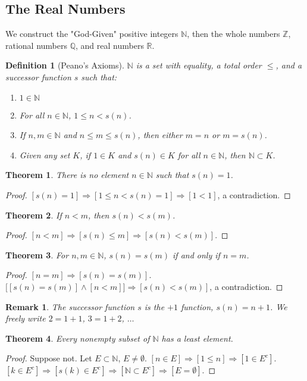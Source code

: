 \documentclass[crop=false,class=book]{standalone}
\theoremstyle{mystyle}
\newtheorem{theorem}{Theorem}[section]
\newtheorem{definition}{Definition}[section]
\newtheorem{remark}{Remark}[section]
\begin{document}
\subsection{The Real Numbers}
We construct the "God-Given" positive integers $\mathbb{N}$, then the whole numbers $\mathbb{Z}$, rational numbers $\mathbb{Q}$, and real numbers $\mathbb{R}$.
\begin{definition}[Peano's Axioms]
$\mathbb{N}$ is a set with equality, a total order $\leq$, and a successor function $s$ such that:
\begin{enumerate}
\item $1\in \mathbb{N}$
\item For all $n\in \mathbb{N}$, $1\leq n < s(n)$.
\item If $n,m\in \mathbb{N}$ and $n\leq m \leq s(n)$, then either $m=n$ or $m=s(n)$.
\item Given any set $K$, if $1\in K$ and $s(n)\in K$ for all $n\in \mathbb{N}$, then $\mathbb{N}\subset K$.
\end{enumerate}
\end{definition}
\begin{theorem}
There is no element $n\in \mathbb{N}$ such that $s(n) =1$.
\end{theorem}
\begin{proof}
$[s(n) = 1]\Rightarrow [1\leq n < s(n)=1]\Rightarrow[1<1]$, a contradiction.
\end{proof}
\begin{theorem}
If $n<m$, then $s(n)< s(m)$.
\end{theorem}
\begin{proof}
$[n<m]\Rightarrow [s(n)\leq m] \Rightarrow [s(n) < s(m)]$.
\end{proof}
\begin{theorem}
For $n,m\in \mathbb{N}$, $s(n)=s(m)$ if and only if $n=m$.
\end{theorem}
\begin{proof}
$[n=m]\Rightarrow [s(n)=s(m)]$. $\big[[s(n)=s(m)]\land [n<m]\big] \Rightarrow [s(n)<s(m)]$, a contradiction.
\end{proof}
\begin{remark}
The successor function $s$ is the $+1$ function, $s(n)=n+1$. We freely write $2=1+1$, $3=1+2$, $\hdots$
\end{remark}
\begin{theorem}
Every nonempty subset of $\mathbb{N}$ has a least element.
\end{theorem}
\begin{proof}
Suppose not. Let $E\subset \mathbb{N}$, $E\ne\emptyset$. $[n\in E]\Rightarrow [1\leq n]\Rightarrow [1\in E^c]$. $[k\in E^c]\Rightarrow [s(k)\in E^c]\Rightarrow [\mathbb{N} \subset E^c]\Rightarrow [E = \emptyset]$.
\end{proof}
\end{document}
